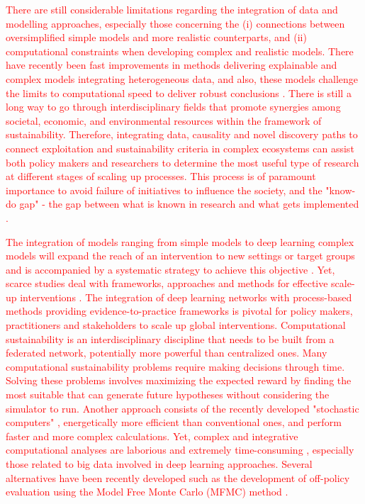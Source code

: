 \documentclass[12pt,a4paper]{article}
\begin{document}
\textcolor{red}{There are still considerable limitations regarding the integration of data and modelling approaches, especially those concerning the (i) connections between oversimplified simple models and more realistic counterparts, and (ii) computational constraints when developing complex and realistic models. There have recently been fast improvements in methods delivering explainable and complex models integrating heterogeneous data, and also, these models challenge the limits to computational speed to deliver robust conclusions \citep{rodrigues2014integrative}. There is still a long way to go through interdisciplinary fields that promote synergies among societal, economic, and environmental resources within the framework of sustainability. Therefore, integrating data, causality and novel discovery paths to connect exploitation and sustainability criteria in complex ecosystems can assist both policy makers and researchers to determine the most useful type of research at different stages of scaling up processes. This process is of paramount importance to avoid failure of initiatives to influence the society, and the "know-do gap" - the gap between what is known in research and what gets implemented \citep{catford2009advancing}.}

\textcolor{red}{The integration of models ranging from simple models to deep learning complex models will expand the reach of an intervention to new settings or target groups and is accompanied by a systematic strategy to achieve this objective \citep{milat2014increasing}. Yet, scarce studies deal with frameworks, approaches and methods for effective scale-up interventions \citep{wigboldus2013towards, yamey2012barriers}. The integration of deep learning networks with process-based methods providing evidence-to-practice frameworks is pivotal for policy makers, practitioners and stakeholders to scale up global interventions. Computational sustainability is an interdisciplinary discipline that needs to be built from a federated network, potentially more powerful than centralized ones. Many computational sustainability problems require making decisions through time. Solving these problems involves maximizing the expected reward by finding the most suitable that can generate future hypotheses without considering the simulator to run. Another approach consists of the recently developed "stochastic computers" \citep{borders2019integer}, energetically more efficient than conventional ones, and perform faster and more complex calculations. Yet, complex and integrative computational analyses are laborious and extremely time-consuming \citep{rodrigues2014integrative}, especially those related to big data involved in deep learning approaches. Several alternatives have been recently developed such as the development of off-policy evaluation using the Model Free Monte Carlo (MFMC) method \citep{fonteneau2010model}.}
\end{document}
